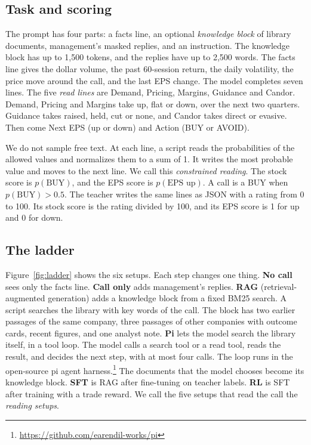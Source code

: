 \documentclass[sigconf,nonacm]{acmart}
\begin{document}
\subsection{Task and scoring}

The prompt has four parts: a facts line, an optional \emph{knowledge block} of library documents, management's masked replies, and an instruction.
The knowledge block has up to 1{,}500 tokens, and the replies have up to 2{,}500 words.
The facts line gives the dollar volume, the past 60-session return, the daily volatility, the price move around the call, and the last EPS change.
The model completes seven lines.
The five \emph{read lines} are Demand, Pricing, Margins, Guidance and Candor.
Demand, Pricing and Margins take up, flat or down, over the next two quarters.
Guidance takes raised, held, cut or none, and Candor takes direct or evasive.
Then come Next EPS (up or down) and Action (BUY or AVOID).

We do not sample free text.
At each line, a script reads the probabilities of the allowed values and normalizes them to a sum of 1.
It writes the most probable value and moves to the next line.
We call this \emph{constrained reading}.
The stock score is $p(\text{BUY})$, and the EPS score is $p(\text{EPS up})$.
A call is a BUY when $p(\text{BUY}) > 0.5$.
The teacher writes the same lines as JSON with a rating from 0 to 100.
Its stock score is the rating divided by 100, and its EPS score is 1 for up and 0 for down.

\subsection{The ladder}\label{sec:ladder}

Figure~\ref{fig:ladder} shows the six setups.
Each step changes one thing.
\textbf{No call} sees only the facts line.
\textbf{Call only} adds management's replies.
\textbf{RAG} (retrieval-augmented generation) adds a knowledge block from a fixed BM25 search.
A script searches the library with key words of the call.
The block has two earlier passages of the same company, three passages of other companies with outcome cards, recent figures, and one analyst note.
\textbf{Pi} lets the model search the library itself, in a tool loop.
The model calls a search tool or a read tool, reads the result, and decides the next step, with at most four calls.
The loop runs in the open-source pi agent harness.\footnote{\url{https://github.com/earendil-works/pi}}
The documents that the model chooses become its knowledge block.
\textbf{SFT} is RAG after fine-tuning on teacher labels.
\textbf{RL} is SFT after training with a trade reward.
We call the five setups that read the call the \emph{reading setups}.
\end{document}
